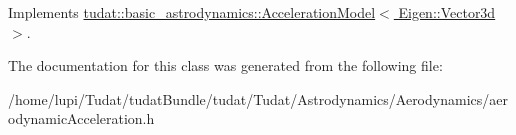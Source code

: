 Implements \hyperlink{classtudat_1_1basic__astrodynamics_1_1AccelerationModel_a966e85b72300b8cbc99ba60e40108d71}{tudat\+::basic\+\_\+astrodynamics\+::\+Acceleration\+Model$<$ Eigen\+::\+Vector3d $>$}.



The documentation for this class was generated from the following file\+:\begin{DoxyCompactItemize}
\item 
/home/lupi/\+Tudat/tudat\+Bundle/tudat/\+Tudat/\+Astrodynamics/\+Aerodynamics/aerodynamic\+Acceleration.\+h\end{DoxyCompactItemize}
